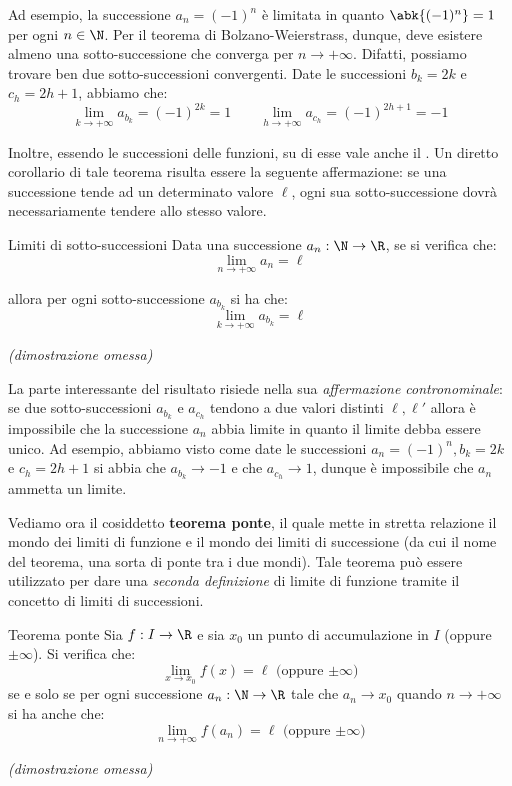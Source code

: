 \documentclass[a4paper, 12pt]{report}
\begin{document}
    Ad esempio, la successione $a_{n} = (-1)^n$ è limitata in quanto $\abk{(-1)^n} = 1$ per ogni $n \in \N$. Per il teorema di Bolzano-Weierstrass, dunque, deve esistere almeno una sotto-successione che converga per $n \to +\infty$. Difatti, possiamo trovare ben due sotto-successioni convergenti. Date le successioni $b_k = 2k$ e $c_h = 2h+1$, abbiamo che:
    \[\lim_{k \to +\infty} a_{b_k} = (-1)^{2k} = 1 \qquad \lim_{h \to +\infty} a_{c_h} = (-1)^{2h+1} = -1\]

    Inoltre, essendo le successioni delle funzioni, su di esse vale anche il . Un diretto corollario di tale teorema risulta essere la seguente affermazione: se una successione tende ad un determinato valore $\ell$, ogni sua sotto-successione dovrà necessariamente tendere allo stesso valore.

    \begin{framedthm}{Limiti di sotto-successioni}
        Data una successione $a_n : \N \to \R$, se si verifica che:
        \[\lim_{n \to +\infty} a_n = \ell\]

        allora per ogni sotto-successione $a_{b_k}$ si ha che:
        \[\lim_{k \to +\infty} a_{b_k} = \ell\]

        \textit{(dimostrazione omessa)}
    \end{framedthm}

    La parte interessante del risultato risiede nella sua \textit{affermazione contronominale}: se due sotto-successioni $a_{b_k}$ e $a_{c_h}$ tendono a due valori distinti $\ell, \ell'$ allora è impossibile che la successione $a_n$ abbia limite in quanto il limite debba essere unico. Ad esempio, abbiamo visto come date le successioni $a_n = (-1)^n, b_k = 2k$ e $c_h = 2h+1$ si abbia che $a_{b_k} \to -1$ e che $a_{c_h} \to 1$, dunque è impossibile che $a_n$ ammetta un limite.

    Vediamo ora il cosiddetto \textbf{teorema ponte}, il quale mette in stretta relazione il mondo dei limiti di funzione e il mondo dei limiti di successione (da cui il nome del teorema, una sorta di ponte tra i due mondi). Tale teorema può essere utilizzato per dare una \textit{seconda definizione} di limite di funzione tramite il concetto di limiti di successioni.

    \begin{framedthm}{Teorema ponte}
        Sia $f : I \to \R$ e sia $x_0$ un punto di accumulazione in $I$ (oppure $\pm \infty$). Si verifica che:
        \[\lim_{x \to x_0} f(x) = \ell \text{ (oppure $\pm \infty$)}\]
        se e solo se per ogni successione $a_n : \N \to \R$ tale che $a_n \to x_0$ quando $n \to +\infty$ si ha anche che:
        \[\lim_{n \to +\infty} f(a_n) = \ell \text{ (oppure $\pm \infty$)}\]

        \textit{(dimostrazione omessa)}
    \end{framedthm}
\end{document}
